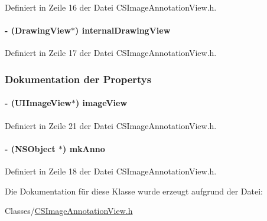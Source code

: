 Definiert in Zeile 16 der Datei CSImageAnnotationView.h.\hypertarget{interface_c_s_image_annotation_view_ad20380a97d7e751f70ceffbbe757e748}{
\paragraph[{internalDrawingView}]{\setlength{\rightskip}{0pt plus 5cm}-\/ ({\bf DrawingView}$\ast$) {\bf internalDrawingView}}\hfill}
\label{interface_c_s_image_annotation_view_ad20380a97d7e751f70ceffbbe757e748}


Definiert in Zeile 17 der Datei CSImageAnnotationView.h.

\subsubsection{Dokumentation der Propertys}
\hypertarget{interface_c_s_image_annotation_view_a1a6064acb727d00905158ab1938a9b8b}{
\paragraph[{imageView}]{\setlength{\rightskip}{0pt plus 5cm}-\/ (UIImageView$\ast$) imageView}\hfill}
\label{interface_c_s_image_annotation_view_a1a6064acb727d00905158ab1938a9b8b}


Definiert in Zeile 21 der Datei CSImageAnnotationView.h.\hypertarget{interface_c_s_image_annotation_view_a1e946230b4fb6f249eb43cc61e5e7978}{
\paragraph[{mkAnno}]{\setlength{\rightskip}{0pt plus 5cm}-\/ (NSObject $\ast$) mkAnno}\hfill}
\label{interface_c_s_image_annotation_view_a1e946230b4fb6f249eb43cc61e5e7978}


Definiert in Zeile 18 der Datei CSImageAnnotationView.h.

Die Dokumentation für diese Klasse wurde erzeugt aufgrund der Datei:\begin{DoxyCompactItemize}
\item 
Classes/\hyperlink{_c_s_image_annotation_view_8h}{CSImageAnnotationView.h}\end{DoxyCompactItemize}
